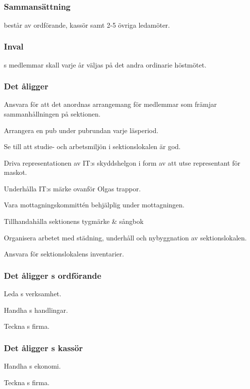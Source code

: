 \subsection{\PRITFULL}
\subsubsection{Sammansättning}
\PRIT{} består av ordförande, kassör samt 2-5 övriga ledamöter.

\subsubsection{Inval}
\PRIT{}s medlemmar skall varje år väljas på det andra ordinarie höstmötet.

\subsubsection{Det åligger \PRIT}
\begin{att}
	\item Ansvara för att det anordnas arrangemang för medlemmar som främjar sammanhållningen på sektionen.
	\item Arrangera en pub under pubrundan varje läsperiod.
	\item Se till att studie- och arbetsmiljön i sektionslokalen är god.
	\item Driva representationen av IT:s skyddshelgon i form av att utse representant för maskot.
	\item Underhålla IT:s märke ovanför Olgas trappor.
	\item Vara mottagningskommittén behjälplig under mottagningen.
	\item Tillhandahålla sektionens tygmärke \& sångbok
	\item Organisera arbetet med städning, underhåll och nybyggnation av sektionslokalen.
	\item Ansvara för sektionslokalens inventarier.
\end{att}

\subsubsection{Det åligger \PRIT{}s ordförande}
\begin{att}
	\item Leda \PRIT{}s verksamhet.
	\item Handha \PRIT{}s handlingar.
	\item Teckna \PRIT{}s firma.
\end{att}

\subsubsection{Det åligger \PRIT{}s kassör}
\begin{att}
	\item Handha \PRIT{}s ekonomi.
	\item Teckna \PRIT{}s firma.
\end{att}

